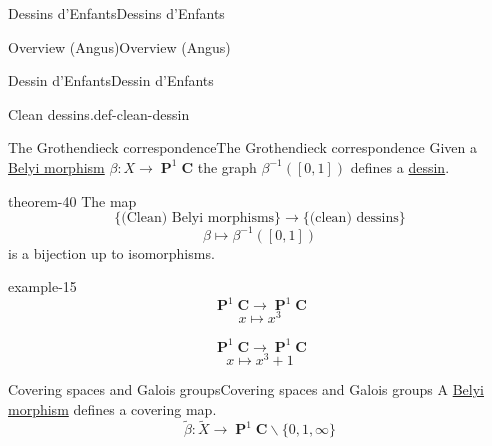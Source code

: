 \documentclass[10pt,]{book}
\numberwithin{equation}{section}
\newcommand{\inv}{^{-1}}
\newcommand{\lb}{[}
\newcommand{\rb}{]}
\newcommand{\CC}{\mathbf{C}}
\DeclareMathOperator{\PP}{\mathbf{P}}
\begin{document}
\begin{chapterptx}{Dessins d'Enfants}{}{Dessins d'Enfants}{}{}
\begin{sectionptx}{Overview (Angus)}{}{Overview (Angus)}{}{}
\begin{subsectionptx}{Dessin d'Enfants}{}{Dessin d'Enfants}{}{}
\begin{definition}{Clean dessins.}{def-clean-dessin}
\end{definition}
\end{subsectionptx}
%
%
\typeout{************************************************}
\typeout{************************************************}
%
\begin{subsectionptx}{The Grothendieck correspondence}{}{The Grothendieck correspondence}{}{}\label{subsection-41}
\hypertarget{p-468}{}%
Given a \hyperref[def-belyi-morphism]{Belyi morphism} \(\beta\colon X \to \PP^1 \CC\) the graph \(\beta^{-1}(\lb 0,1\rb)\) defines a \hyperref[def-dessin-denfant]{dessin}.%
\begin{theorem}{}{}{theorem-40}%
\hypertarget{p-469}{}%
The map%
\begin{equation*}
\{\text{(Clean) Belyi morphisms}\} \to \{\text{(clean) dessins}\}
\end{equation*}
%
\begin{equation*}
\beta \mapsto \beta\inv([0,1])
\end{equation*}
is a bijection up to isomorphisms.%
\end{theorem}
\begin{example}{}{example-15}%
\hypertarget{p-470}{}%
%
\begin{equation*}
\PP^1 \CC\to \PP^1\CC
\end{equation*}
%
\begin{equation*}
x\mapsto x^3
\end{equation*}
%
\par
\hypertarget{p-471}{}%
%
\begin{equation*}
\PP^1 \CC\to \PP^1\CC
\end{equation*}
%
\begin{equation*}
x\mapsto x^3 + 1
\end{equation*}
%
\end{example}
\end{subsectionptx}
%
%
\typeout{************************************************}
\typeout{************************************************}
%
\begin{subsectionptx}{Covering spaces and Galois groups}{}{Covering spaces and Galois groups}{}{}\label{subsection-42}
\hypertarget{p-472}{}%
A \hyperref[def-belyi-morphism]{Belyi morphism} defines a covering map.%
\begin{equation*}
\tilde \beta\colon \tilde X \to \PP^1 \CC\smallsetminus \{0,1,\infty\}
\end{equation*}

\end{subsectionptx}
\end{sectionptx}
\end{chapterptx}
\end{document}
